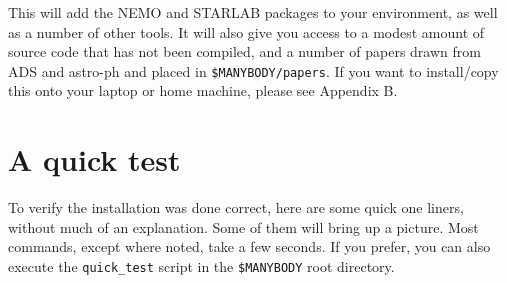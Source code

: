 This will add the NEMO and STARLAB packages to your environment, as well as
a number of other tools. It will also give you access to
a modest amount of source code that has not been compiled, and a number
of papers drawn from ADS and astro-ph and placed in {\tt \$MANYBODY/papers}.
If you want to install/copy this onto your laptop or home machine, please
see Appendix B.

\section{A quick test}

To verify the installation was done correct, here are some quick
one liners, without much of an explanation. Some of them will bring up
a picture. Most commands, except where noted, take a few seconds. If
you prefer, you can also execute the {\tt quick\_test} script in
the {\tt \$MANYBODY} root directory.
